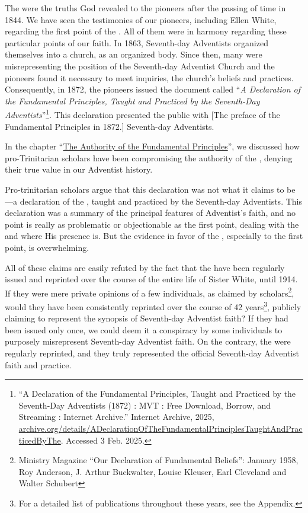 The  were the truths God revealed to the pioneers after the passing of time in 1844. We have seen the testimonies of our pioneers, including Ellen White, regarding the first point of the . All of them were in harmony regarding these particular points of our faith. In 1863, Seventh-day Adventists organized themselves into a church, as an organized body. Since then, many were misrepresenting the position of the Seventh-day Adventist Church and the pioneers found it necessary to meet inquiries,  the church’s beliefs and practices. Consequently, in 1872, the pioneers issued the document called “\textit{A Declaration of the Fundamental Principles, Taught and Practiced by the Seventh-Day Adventists}”\footnote{“A Declaration of the Fundamental Principles, Taught and Practiced by the Seventh-Day Adventists (1872) : MVT : Free Download, Borrow, and Streaming : Internet Archive.” Internet Archive, 2025, \href{https://archive.org/details/ADeclarationOfTheFundamentalPrinciplesTaughtAndPracticedByThe}{archive.org/details/ADeclarationOfTheFundamentalPrinciplesTaughtAndPracticedByThe}. Accessed 3 Feb. 2025.}. This declaration presented the public with [The preface of the Fundamental Principles in 1872.] Seventh-day Adventists.

In the chapter “\hyperref[chap:authority]{The Authority of the Fundamental Principles}”, we discussed how pro-Trinitarian scholars have been compromising the authority of the , denying their true value in our Adventist history.

Pro-trinitarian scholars argue that this declaration was not what it claims to be—a declaration of the , taught and practiced by the Seventh-day Adventists. This declaration was a summary of the principal features of Adventist’s faith, and no point is really as problematic or objectionable as the first point, dealing with the  and where His presence is. But the evidence in favor of the , especially to the first point, is overwhelming.

All of these claims are easily refuted by the fact that the  have been regularly issued and reprinted over the course of the entire life of Sister White, until 1914. If they were mere private opinions of a few individuals, as claimed by scholars\footnote{Ministry Magazine “Our Declaration of Fundamental Beliefs”: January 1958, Roy Anderson, J. Arthur Buckwalter, Louise Kleuser, Earl Cleveland and Walter Schubert}, would they have been consistently reprinted over the course of 42 years\footnote{For a detailed list of publications throughout these years, see the Appendix.}, publicly claiming to represent the synopsis of Seventh-day Adventist faith? If they had been issued only once, we could deem it a conspiracy by some individuals to purposely misrepresent Seventh-day Adventist faith. On the contrary, the  were regularly reprinted, and they truly represented the official Seventh-day Adventist faith and practice.

